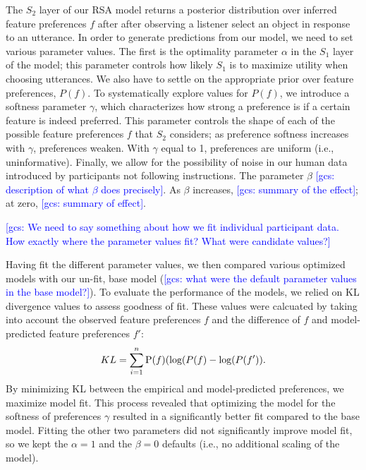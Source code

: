 \documentclass[10pt,a4paper]{article}
\newcommand{\gcs}[1]{\textcolor{blue}{[gcs: #1]}}
\begin{document}
The $S_2$ layer of our RSA model returns a posterior distribution over inferred feature preferences $f$ after after observing a listener select an object in response to an utterance. In order to generate predictions from our model, we need to set various parameter values. The first is the optimality parameter $\alpha$ in the $S_1$ layer of the model; this parameter controls how likely $S_1$ is to maximize utility when choosing utterances. We also have to settle on the appropriate prior over feature preferences, $P(f)$. To systematically explore values for $P(f)$, we introduce a softness parameter $\gamma$, which characterizes how strong a preference is if a certain feature is indeed preferred. This parameter controls the shape of each of the possible feature preferences $f$ that $S_2$ considers; as preference softness increases with $\gamma$, preferences weaken. With $\gamma$ equal to 1, preferences are uniform (i.e., uninformative). Finally, we allow for the possibility of noise in our human data introduced by participants not following instructions. The parameter $\beta$ \gcs{description of what $\beta$ does precisely}. As $\beta$ increases, \gcs{summary of the effect}; at zero, \gcs{summary of effect}.

\gcs{We need to say something about how we fit individual participant data. How exactly where the parameter values fit? What were candidate values?}

Having fit the different parameter values, we then compared various optimized models with our un-fit, base model (\gcs{what were the default parameter values in the base model?}). To evaluate the performance of the models, we relied on KL divergence values to assess  goodness of fit. These values were calcuated by taking into account the observed feature preferences $f$ and the difference of $f$ and model-predicted feature preferences $f'$:  
$$KL = \sum_{i=1}^{n}\textrm P(f) (\textrm {log} (P(f) - \textrm {log} (P(f')).$$
By minimizing KL between the empirical and model-predicted preferences, we maximize model fit. This process revealed that optimizing the model for the softness of preferences $\gamma$ resulted in a significantly better fit compared to the base model. Fitting the other two parameters did not significantly improve model fit, so we kept the $\alpha = 1 $ and the $\beta = 0$ defaults (i.e., no additional scaling of the model). 
\end{document}
